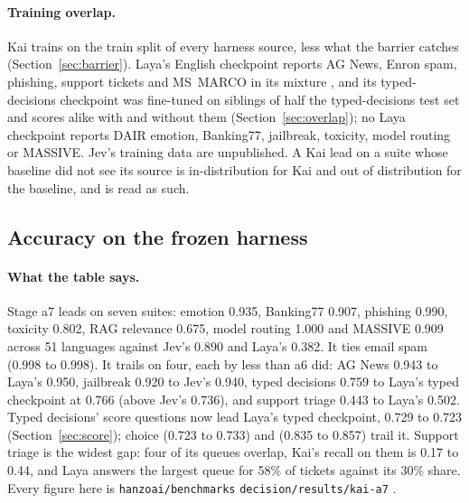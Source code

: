 \paragraph{Training overlap.}
Kai trains on the train split of every harness source, less what the barrier
catches (Section~\ref{sec:barrier}). Laya's English checkpoint reports AG News,
Enron spam, phishing, support tickets and MS~MARCO in its mixture \reported, and
its typed-decisions checkpoint was fine-tuned on siblings of half the
typed-decisions test set and scores alike with and without them
(Section~\ref{sec:overlap}); no Laya checkpoint reports
DAIR emotion, Banking77, jailbreak, toxicity, model routing or MASSIVE. Jev's
training data are unpublished. A Kai lead on a suite whose baseline did not see
its source is in-distribution for Kai and out of distribution for the baseline,
and is read as such.

\subsection{Accuracy on the frozen harness}
\label{sec:accuracy}

\begin{table}[tbp]
\centering
\small
\setlength{\tabcolsep}{4pt}

\caption{Accuracy, Brier score and ECE on the frozen harness, per suite, for
Kai, Laya and Jev. MASSIVE is the macro over its 51 languages
(Table~\ref{tab:languages}); the macro row is over the other eleven suites.
Bold: the best accuracy of the three in a row among backends that did not
train on that suite's test rows. $^\dagger$: Laya's card lists the suite's
dataset in its mixture and the harness draws the suite from that dataset's
train split; the clean macro omits those suites. Written by \texttt{bench
tex}; the last row names the revisions.}
\label{tab:harness}
\end{table}

\paragraph{What the table says.}
Stage a7 leads on seven suites: emotion 0.935, Banking77 0.907, phishing
0.990, toxicity 0.802, RAG relevance 0.675, model routing 1.000 and MASSIVE
0.909 across 51 languages against Jev's 0.890 and Laya's 0.382. It ties email
spam (0.998 to 0.998). It trails on four, each by less than a6 did: AG News
0.943 to Laya's 0.950, jailbreak 0.920 to Jev's 0.940, typed decisions 0.759 to
Laya's typed checkpoint at 0.766 (above Jev's 0.736), and support triage 0.443
to Laya's 0.502. Typed decisions' score questions now lead Laya's typed
checkpoint, 0.729 to 0.723 (Section~\ref{sec:score}); choice (0.723 to 0.733)
and  (0.835 to 0.857) trail it. Support triage is the widest gap:
four of its queues overlap, Kai's recall on them is 0.17 to 0.44, and Laya
answers the largest queue for 58\% of tickets against its 30\% share. Every
figure here is \texttt{hanzoai/benchmarks} \texttt{decision/results/kai-a7}
\meas.

